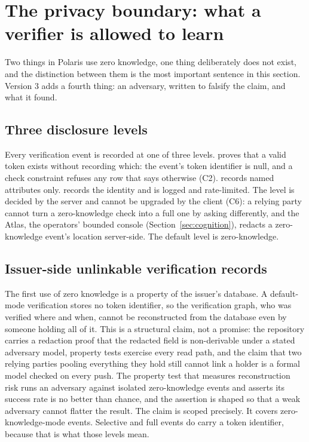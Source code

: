 \section{The privacy boundary: what a verifier is allowed to learn}
\label{sec:privacy}



Two things in Polaris use zero knowledge, one thing deliberately does not exist, and the distinction
between them is the most important sentence in this section. Version 3 adds a fourth thing: an
adversary, written to falsify the claim, and what it found.

\subsection{Three disclosure levels}

Every verification event is recorded at one of three levels.  proves that a
valid token exists without recording which: the event's token identifier is null, and a check
constraint refuses any row that says otherwise (C2).  records named attributes only.
 records the identity and is logged and rate-limited. The level is decided by the server
and cannot be upgraded by the client (C6): a relying party cannot turn a zero-knowledge check into a
full one by asking differently, and the Atlas, the operators' bounded console (Section~\ref{sec:cognition}), redacts a zero-knowledge event's location server-side.
The default level is zero-knowledge. \sImpl

\subsection{Issuer-side unlinkable verification records}

The first use of zero knowledge is a property of the issuer's database. A default-mode verification
stores no token identifier, so the verification graph, who was verified where and when, cannot be
reconstructed from the database even by someone holding all of it. This is a structural claim, not a
promise: the repository carries a redaction proof that the redacted field is non-derivable under a
stated adversary model, property tests exercise every read path, and the claim that two relying
parties pooling everything they hold still cannot link a holder is a formal model checked on every
push. The property test that measures reconstruction risk runs an adversary against isolated
zero-knowledge events and asserts its success rate is no better than chance, and the assertion is
shaped so that a weak adversary cannot flatter the result. The claim is scoped precisely. It covers
zero-knowledge-mode events. Selective and full events do carry a token identifier, because that is
what those levels mean. \sImpl

